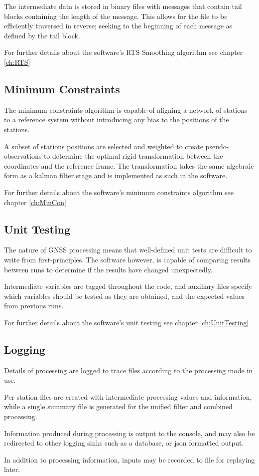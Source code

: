 The intermediate data is stored in binary files with messages that contain tail blocks containing the length of the message. This allows for the file to be efficiently traversed in reverse; seeking to the beginning of each message as defined by the tail block.

For further details about the software's RTS Smoothing algorithm see chapter \ref{ch:RTS}


\subsection{Minimum Constraints}

The minimum constraints algorithm is capable of aligning a network of stations to a reference system without introducing any bias to the positions of the stations.

A subset of stations positions are selected and weighted to create pseudo-observations to determine the optimal rigid transformation between the coordinates and the reference frame. The transformation takes the same algebraic form as a kalman filter stage and is implemented as such in the software.

For further details about the software's minimum constraints algorithm see chapter \ref{ch:MinCon}


\subsection{Unit Testing}

The nature of GNSS processing means that well-defined unit tests are difficult to write from first-principles. The software however, is capable of comparing results between runs to determine if the results have changed unexpectedly.

Intermediate variables are tagged throughout the code, and auxiliary files specify which variables should be tested as they are obtained, and the expected values from previous runs.

For further details about the software's unit testing see chapter \ref{ch:UnitTesting}

\subsection{Logging}

Details of processing are logged to trace files according to the processing mode in use.

Per-station files are created with intermediate processing values and information, while a single summary file is generated for the unified filter and combined processing.

Information produced during processing is output to the console, and may also be redirected to other logging sinks such as a database, or json formatted output.

In addition to processing information, inputs may be recorded to file for replaying later.

 

 